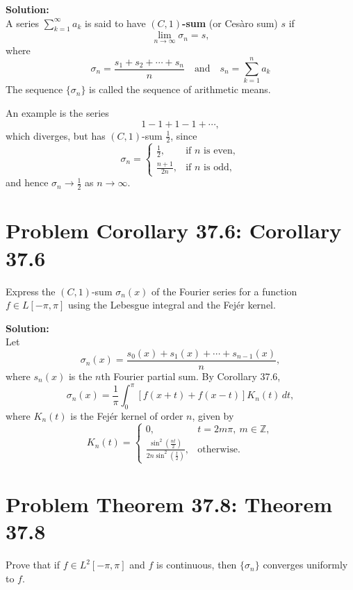 \documentclass[a4paper]{article}
\theoremstyle{definition}
\newcounter{problem}
\newenvironment{problem}[1][]
{
    \stepcounter{problem}
    \section*{Problem \theproblem\ifx\relax#1\relax\else: #1\fi}
}
{}
\newenvironment{solution}
{
    \noindent\textbf{Solution:}\\
}
{
    
}
\begin{document}
\vspace{2em}
\begin{solution}
A series $\sum_{k=1}^{\infty} a_k$ is said to have \textbf{$(C,1)$-sum} (or Ces\`aro sum) $s$ if
\[
\lim_{n\to\infty}\sigma_n = s,
\]
where
\[
\sigma_n = \frac{s_1+s_2+\cdots+s_n}{n}
\quad \text{and} \quad
s_n = \sum_{k=1}^{n} a_k
\]
The sequence $\{\sigma_n\}$ is called the sequence of arithmetic means.

\vspace{2em}
\noindent An example is the series
\[
1 - 1 + 1 - 1 + \cdots,
\]
which diverges, but has $(C,1)$-sum $\frac{1}{2}$, since
\[
\sigma_n =
\begin{cases}
\frac{1}{2}, & \text{if } n \text{ is even},\\[6pt]
\frac{n+1}{2n}, & \text{if } n \text{ is odd},
\end{cases}
\]
and hence $\sigma_n \to \frac{1}{2}$ as $n\to\infty$.
\end{solution}

\newpage
\begin{problem}[Corollary 37.6]
Express the $(C,1)$-sum $\sigma_n(x)$ of the Fourier series for a function
$f\in L[-\pi,\pi]$ using the Lebesgue integral and the Fej\'er kernel.
\end{problem}

\vspace{2em}
\begin{solution}
Let
\[
    \sigma_n(x)=\frac{s_0(x)+s_1(x)+\cdots+s_{n-1}(x)}{n},
\]
where $s_n(x)$ is the $n$th Fourier partial sum. By Corollary 37.6,
\[
    \sigma_n(x)
    =
    \frac{1}{\pi}\int_0^\pi
    [f(x+t)+f(x-t)]K_n(t)\,dt,
\]
where $K_n(t)$ is the Fej\'er kernel of order $n$, given by
\[
K_n(t)=
\begin{cases}
0, & t=2m\pi,\ m\in\mathbb{Z},\\[6pt]
\displaystyle
\frac{\sin^2\left(\frac{nt}{2}\right)}
{2n\sin^2\left(\frac{t}{2}\right)},
& \text{otherwise}.
\end{cases}
\]
\end{solution}

\newpage
\begin{problem}[Theorem 37.8]
Prove that if $f\in L^2[-\pi,\pi]$ and $f$ is continuous, then
$\{\sigma_n\}$ converges uniformly to $f$.
\end{problem}
\end{document}
